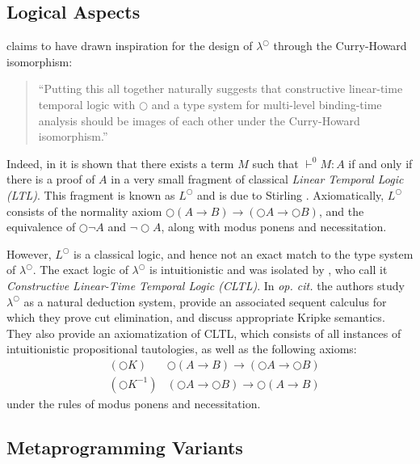 \documentclass[a4paper]{amsart}
\begin{document}
\subsection{Logical Aspects}

\cite{Davies1995, Davies1996a} claims to have drawn inspiration for
the design of $\lambda^\bigcirc$ through the Curry-Howard
isomorphism: \begin{quote}
  ``Putting this all together naturally suggests that constructive
  linear-time temporal logic with $\bigcirc$ and a type system for
  multi-level binding-time analysis should be images of each other
  under the Curry-Howard isomorphism.''
\end{quote}

Indeed, in \citep{Davies1996a} it is shown that there exists a term
$M$ such that $\vdash^0 M : A$ if and only if there is a proof of
$A$ in a very small fragment of classical \emph{Linear Temporal Logic
(LTL)}. This fragment is known as $L^\bigcirc$ and is due to
Stirling \cite[p. 516]{Stirling1993}. Axiomatically, $L^\bigcirc$
consists of the normality axiom $\bigcirc(A \rightarrow B)
\rightarrow (\bigcirc A \rightarrow \bigcirc B)$, and the
equivalence of $\bigcirc \lnot A$ and $\lnot \bigcirc A$, along
with modus ponens and necessitation.

However, $L^\bigcirc$ is a classical logic, and hence not an exact
match to the type system of $\lambda^\bigcirc$. The exact logic of
$\lambda^\bigcirc$ is intuitionistic and was isolated by
\cite{Kojima2011}, who call it \emph{Constructive Linear-Time
Temporal Logic (\textsf{CLTL})}. In \emph{op. cit.} the authors study
$\lambda^\bigcirc$ as a natural deduction system, provide an
associated sequent calculus for which they prove cut elimination,
and discuss appropriate Kripke semantics. They also provide an
axiomatization of \textsf{CLTL}, which consists of all instances of
intuitionistic propositional tautologies, as well as the following
axioms: \begin{align*}
  &(\bigcirc K) &\bigcirc(A \rightarrow B) \rightarrow (\bigcirc A
  \rightarrow \bigcirc B) \\
  &(\bigcirc K^{-1}) &(\bigcirc A \rightarrow \bigcirc B)
  \rightarrow \bigcirc (A \rightarrow B)
\end{align*} under the rules of modus ponens and necessitation.

\subsection{Metaprogramming Variants}
\end{document}
